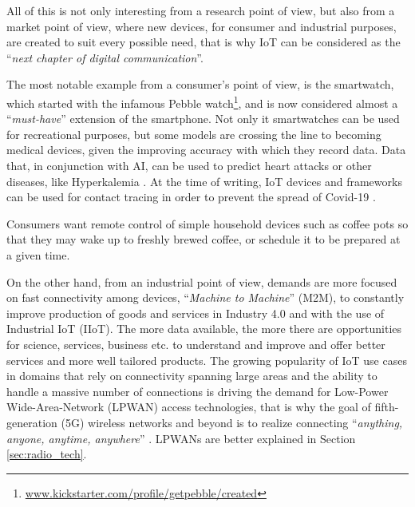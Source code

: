 			All of this is not only interesting from a research point of view, but also from a market point of view, where new devices, for consumer and industrial purposes, are created to suit every possible need, that is why IoT can be considered as the ``\textit{next chapter of digital communication}''.
			
			The most notable example from a consumer's point of view, is the smartwatch, which started with the infamous Pebble watch\footnote{ \url{www.kickstarter.com/profile/getpebble/created}}, and is now considered almost a ``\textit{must-have}'' extension of the smartphone.
			Not only it smartwatches can be used for recreational purposes, but some models are crossing the line to becoming medical devices, given the improving accuracy with which they record data.
			Data that, in conjunction with AI, can be used to predict heart attacks \cite{7946780} or other diseases, like Hyperkalemia \cite{HYPERKALEMIA}.
			At the time of writing, IoT devices and frameworks can be used for contact tracing in order to prevent the spread of Covid-19 \cite{9181512}.
			
			Consumers want remote control of simple household devices such as coffee pots so that they may wake up to freshly	brewed coffee, or schedule it to be prepared at a given time.
			
			On the other hand, from an industrial point of view, demands are more focused on fast connectivity among devices, ``\textit{Machine to Machine}'' (M2M), to constantly improve production of goods and services in Industry 4.0 and with the use of Industrial IoT (IIoT).
			The more data available, the more there are opportunities for science, services, business etc. to understand and improve and offer better services and more well tailored products.
			The growing popularity of IoT use cases in domains that rely on connectivity spanning large areas and the ability to handle a massive number of connections is driving the demand for Low-Power Wide-Area-Network (LPWAN) access technologies, that is why the goal of fifth-generation (5G) wireless networks and beyond is to realize connecting ``\textit{anything, anyone, anytime, anywhere}'' \cite{7414384}.
			LPWANs are better explained in Section \ref{sec:radio_tech}.
			

